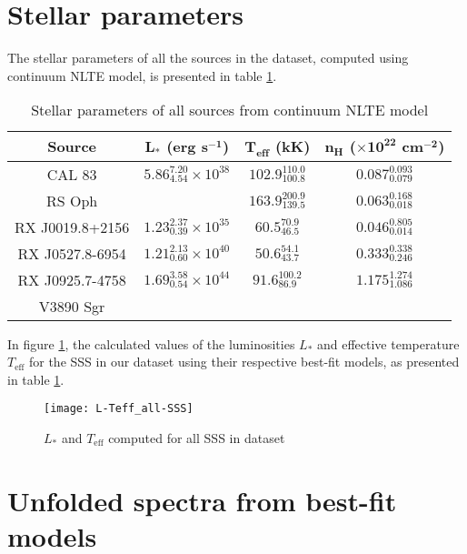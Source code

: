 	\section{Stellar parameters}
		The stellar parameters of all the sources in the dataset, computed using continuum NLTE model, is presented in table \ref{tab:sss-stellar-params}.
		\renewcommand{\arraystretch}{1.8}
		\begin{table}[!htb]
			\centering
			\caption{Stellar parameters of all sources from continuum NLTE model}
			\label{tab:sss-stellar-params}
			\begin{tabular}{cccc}
			\hline
			{\textbf{Source}} & {$\boldsymbol{L_*}$ \textbf{(erg s$\boldsymbol{^{-1}}$)}} & {\textbf{$\boldsymbol{T_\text{eff}}$ (kK)}} & {\textbf{$\boldsymbol{n_H}$ ($\boldsymbol{\times 10^{22}}$ cm$\boldsymbol{^{-2}}$)}} \\
			\hline
			{CAL 83} & {$5.86_{4.54}^{7.20}\times 10^{38}$} & {$102.9_{100.8}^{110.0}$} & {$0.087_{0.079}^{0.093}$} \\
			{RS Oph} & {} & {$163.9_{139.5}^{200.9}$} & {$0.063_{0.018}^{0.168}$} \\
			{RX J0019.8+2156} & {$1.23_{0.39}^{2.37}\times 10^{35}$} & {$60.5_{46.5}^{70.9}$} & {$0.046_{0.014}^{0.805}$} \\
			{RX J0527.8-6954} & {$1.21_{0.60}^{2.13}\times 10^{40}$} & {$50.6_{43.7}^{54.1}$} & {$0.333_{0.246}^{0.338}$} \\
			{RX J0925.7-4758} & {$1.69_{0.54}^{3.58}\times 10^{44}$} & {$91.6_{86.9}^{100.2}$} & {$1.175_{1.086}^{1.274}$} \\
			{V3890 Sgr} & {} & {} & {} \\
			\hline
			\end{tabular}
		\end{table}
		\renewcommand{\arraystretch}{2.2}
		
		In figure \ref{result:L-Teff-SSS}, the calculated values of the luminosities $L_*$ and effective temperature $T_\text{eff}$ for the SSS in our dataset using their respective best-fit models, as presented in table \ref{tab:sss-stellar-params}.
		\begin{figure}[h!]
			\centering
			\texttt{[image: L-Teff\_all-SSS]}
			\caption{$L_*$ and $T_\text{eff}$ computed for all SSS in dataset}
			\label{result:L-Teff-SSS}
		\end{figure}
	
	\section{Unfolded spectra from best-fit models}
	
